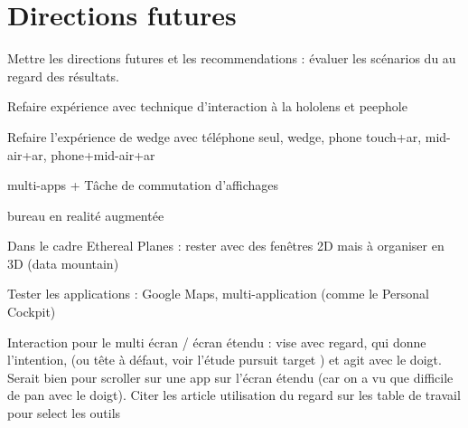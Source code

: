 \chapter{Directions futures}
\label{ch:futur_work}

Mettre les directions futures et les recommendations : évaluer les scénarios du  au regard des résultats.

Refaire expérience avec technique d'interaction à la hololens et peephole

Refaire l'expérience de wedge avec téléphone seul, wedge, phone touch+ar, mid-air+ar, phone+mid-air+ar

multi-apps + Tâche de commutation d'affichages

bureau en realité augmentée

Dans le cadre Ethereal Planes : rester avec des fenêtres 2D mais à organiser en 3D (data mountain)

Tester les applications : Google Maps, multi-application (comme le Personal Cockpit)

Interaction pour le multi écran / écran étendu : vise avec regard, qui donne l'intention, (ou tête à défaut, voir l'étude pursuit target \cite{Esteves2017}) et agit avec le doigt. Serait bien pour scroller sur une app sur l'écran étendu (car on a vu que difficile de pan avec le doigt). Citer les article utilisation du regard sur les table de travail pour select les outils